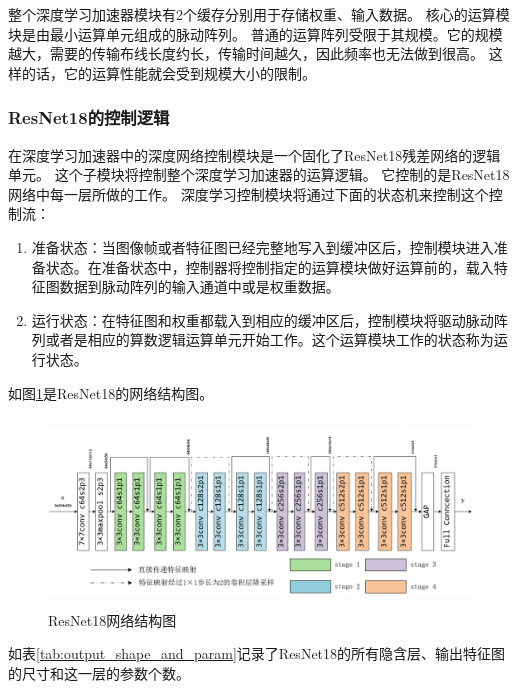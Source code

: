 整个深度学习加速器模块有2个缓存分别用于存储权重、输入数据。
核心的运算模块是由最小运算单元组成的脉动阵列。
普通的运算阵列受限于其规模。它的规模越大，需要的传输布线长度约长，传输时间越久，因此频率也无法做到很高。
这样的话，它的运算性能就会受到规模大小的限制。



\subsubsection{ResNet18的控制逻辑}
在深度学习加速器中的深度网络控制模块是一个固化了ResNet18残差网络\cite{resnet2015}的逻辑单元。
这个子模块将控制整个深度学习加速器的运算逻辑。
它控制的是ResNet18网络中每一层所做的工作。
深度学习控制模块将通过下面的状态机来控制这个控制流：
\begin{enumerate}
    \item 准备状态：当图像帧或者特征图已经完整地写入到缓冲区后，控制模块进入准备状态。在准备状态中，控制器将控制指定的运算模块做好运算前的，载入特征图数据到脉动阵列的输入通道中或是权重数据。
    \item 运行状态：在特征图和权重都载入到相应的缓冲区后，控制模块将驱动脉动阵列或者是相应的算数逻辑运算单元开始工作。这个运算模块工作的状态称为运行状态。
\end{enumerate}  
如图\ref{fig:resnet18_arch}是ResNet18的网络结构图。
\begin{figure}[htbp]
    \centering
    \includegraphics[width=12cm,height=5cm]{figures/resnet18_arch.png}
    \caption{ResNet18网络结构图}
    \label{fig:resnet18_arch}
\end{figure}

如表\ref{tab:output_shape_and_param}记录了ResNet18的所有隐含层、输出特征图的尺寸和这一层的参数个数。

